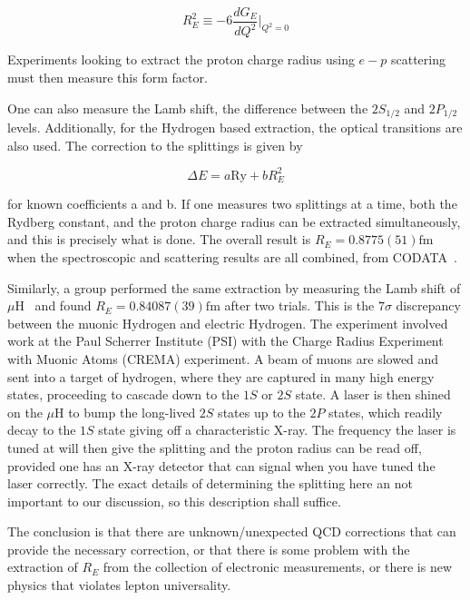 \begin{equation}
    R_E^2 \equiv -6 \frac{d G_E}{d Q^2}\rvert_{Q^2=0}
\end{equation}

\noindent Experiments looking to extract the proton charge radius using $e-p$ scattering must then measure this form factor.

One can also measure the Lamb shift, the difference between the $2S_{1/2}$ and $2P_{1/2}$ levels.
Additionally, for the Hydrogen based extraction, the optical transitions are also used.
The correction to the splittings is given by

\begin{equation}
    \Delta E = a \textrm{Ry} + b R_E^2
\end{equation}

\noindent for known coefficients a and b. If one measures two splittings at a time, both the Rydberg constant, and the proton charge radius can be extracted simultaneously, and this is precisely what is done.
The overall result is $R_E = 0.8775(51)\textrm{fm}$ when the spectroscopic and scattering results are all combined, from CODATA~\cite{Mohr:2012tt}.

Similarly, a group performed the same extraction by measuring the Lamb shift of $\mu\textrm{H}$~\cite{Pohl:2010zza,Antognini:1900ns} and found $R_E = 0.84087(39)\textrm{fm}$ after two trials.
This is the $7\sigma$ discrepancy between the muonic Hydrogen and electric Hydrogen.
The experiment involved work at the Paul Scherrer Institute (PSI) with the Charge Radius Experiment with Muonic Atoms (CREMA) experiment.
A beam of muons are slowed and sent into a target of hydrogen, where they are captured in many high energy states, proceeding to cascade down to the $1S$ or $2S$ state.
A laser is then shined on the $\mu\textrm{H}$ to bump the long-lived $2S$ states up to the $2P$ states, which readily decay to the $1S$ state giving off a characteristic X-ray.
The frequency the laser is tuned at will then give the splitting and the proton radius can be read off, provided one has an X-ray detector that can signal when you have tuned the laser correctly.
The exact details of determining the splitting here an not important to our discussion, so this description shall suffice.

The conclusion is that there are unknown/unexpected QCD corrections that can provide the necessary correction, or that there is some problem with the extraction of $R_E$ from the collection of electronic measurements, or there is new physics that violates lepton universality.

